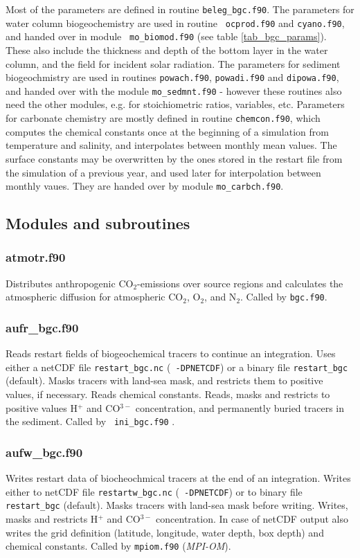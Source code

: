 \documentclass[11pt,a4paper,fleqn,twoside]{article}
\begin{document}
Most of the parameters are defined in routine {\tt beleg\_bgc.f90}. The
parameters for water column biogeochemistry are used in routine {\tt
ocprod.f90} and {\tt cyano.f90}, and handed over in module {\tt
mo\_biomod.f90} (see table \ref{tab_bgc_params}). These also include the thickness
and depth of the bottom layer in the water column, and the field for incident
solar radiation. The parameters for sediment biogeochmistry are used in
routines {\tt powach.f90}, {\tt powadi.f90} and {\tt dipowa.f90}, and handed
over with the module {\tt mo\_sedmnt.f90} - however these routines also need
the other modules, e.g. for stoichiometric ratios, variables, etc. Parameters
for carbonate chemistry are mostly defined in routine {\tt chemcon.f90}, which
computes the chemical constants once at the beginning of a simulation from
temperature and salinity, and interpolates between monthly mean values. The
surface constants may be overwritten by the ones stored in the restart file
from the simulation of a previous year, and used later for interpolation
between monthly vaues. They are handed over by module {\tt mo\_carbch.f90}. 


\subsection{\label{modules}Modules and subroutines} 

\subsubsection{atmotr.f90} 
Distributes anthropogenic CO$_2$-emissions over source regions
and calculates the atmospheric diffusion for atmospheric CO$_2$,
O$_2$, and N$_2$.
Called by {\tt bgc.f90}.

\subsubsection{aufr\_bgc.f90} Reads restart fields of biogeochemical tracers to
continue an integration. Uses either a netCDF file {\tt restart\_bgc.nc} ({\tt
-DPNETCDF}) or a binary file {\tt restart\_bgc} (default). Masks tracers with
land-sea mask, and restricts them to positive values, if necessary. Reads
chemical constants. Reads, masks and restricts to positive values H$^+$ and CO$^{3-}$
concentration, and permanently buried tracers in the sediment.  Called by {\tt
ini\_bgc.f90} .

\subsubsection{aufw\_bgc.f90} Writes restart data of biocheochmical tracers at
the end of an integration. Writes either to netCDF file {\tt restartw\_bgc.nc} ({\tt
-DPNETCDF}) or to binary file {\tt restart\_bgc} (default). Masks tracers 
with land-sea mask before writing. Writes, masks and restricts H$^+$ and
CO$^{3-}$ concentration. In case of netCDF output also writes the grid
definition (latitude, longitude, water depth, box depth) and chemical
constants. Called by {\tt mpiom.f90} ({\em MPI-OM}).
\end{document}
